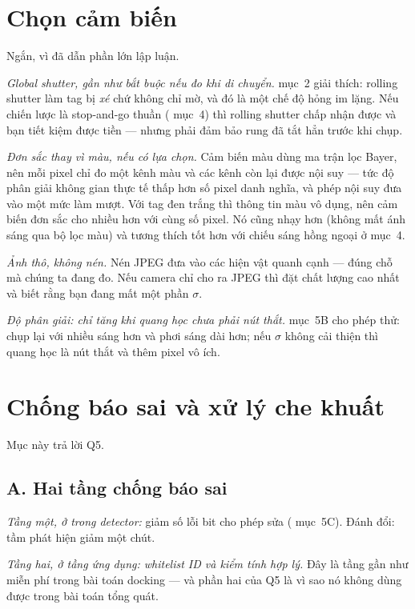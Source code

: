 \documentclass[../../marker.tex]{subfiles}
\begin{document}
\section{Chọn cảm biến}

Ngắn, vì  đã dẫn phần lớn lập luận.

\emph{Global shutter, gần như bắt buộc nếu đo khi di chuyển.}  mục~2 giải thích: rolling shutter làm tag bị \emph{xé} chứ không chỉ mờ, và đó là một chế độ hỏng im lặng. Nếu chiến lược là stop-and-go thuần ( mục~4) thì rolling shutter chấp nhận được và bạn tiết kiệm được tiền --- nhưng phải đảm bảo rung đã tắt hẳn trước khi chụp.

\emph{Đơn sắc thay vì màu, nếu có lựa chọn.} Cảm biến màu dùng ma trận lọc Bayer, nên mỗi pixel chỉ đo một kênh màu và các kênh còn lại được nội suy --- tức độ phân giải không gian thực tế thấp hơn số pixel danh nghĩa, và phép nội suy đưa vào một mức làm mượt. Với tag đen trắng thì thông tin màu vô dụng, nên cảm biến đơn sắc cho nhiều hơn với cùng số pixel. Nó cũng nhạy hơn (không mất ánh sáng qua bộ lọc màu) và tương thích tốt hơn với chiếu sáng hồng ngoại ở mục~4.

\emph{Ảnh thô, không nén.} Nén JPEG đưa vào các hiện vật quanh cạnh --- đúng chỗ mà chúng ta đang đo. Nếu camera chỉ cho ra JPEG thì đặt chất lượng cao nhất và biết rằng bạn đang mất một phần \(\sigma\).

\emph{Độ phân giải: chỉ tăng khi quang học chưa phải nút thắt.}  mục~5B cho phép thử: chụp lại với nhiều sáng hơn và phơi sáng dài hơn; nếu \(\sigma\) không cải thiện thì quang học là nút thắt và thêm pixel vô ích.

\section{Chống báo sai và xử lý che khuất}

Mục này trả lời Q5.

\subsection{A. Hai tầng chống báo sai}

\emph{Tầng một, ở trong detector:} giảm số lỗi bit cho phép sửa ( mục~5C). Đánh đổi: tầm phát hiện giảm một chút.

\emph{Tầng hai, ở tầng ứng dụng: whitelist ID và kiểm tính hợp lý.} Đây là tầng gần như miễn phí trong bài toán docking --- và phần hai của Q5 là vì sao nó không dùng được trong bài toán tổng quát.
\end{document}
